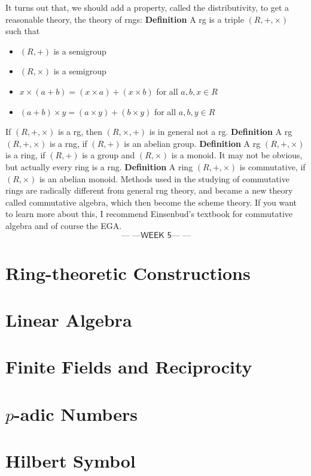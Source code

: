 \documentclass{report}
\newcommand{\week}[1]{$$\textsf{--- ---WEEK #1--- ---}$$}
\begin{document}
It turns out that, we should add a property, called the distributivity, to get a reasonable theory, the theory of rngs:
\newline
\newline
\textbf{Definition} A rg is a triple $(R,+,\times)$ such that
\begin{itemize}
\item $(R,+)$ is a semigroup
\item $(R,\times)$ is a semigroup
\item $x\times(a+b)=(x\times a)+(x\times b)$ for all $a,b,x \in R$
\item $(a+b)\times y = (a\times y)+(b\times y)$ for all $a,b,y \in R$
\end{itemize}
If $(R,+,\times)$ is a rg, then $(R,\times,+)$ is in general not a rg.
\newline
\newline
\textbf{Definition} A rg $(R,+,\times)$ is a rng, if $(R,+)$ is an abelian group.
\newline
\newline
\textbf{Definition} A rg $(R,+,\times)$ is a ring, if $(R,+)$ is a group and $(R,\times)$ is a monoid.
\newline
\newline
It may not be obvious, but actually every ring is a rng.
\newline
\newline
\textbf{Definition} A ring $(R,+,\times)$ is commutative, if $(R,\times)$ is an abelian monoid.
\newline
\newline
Methods used in the studying of commutative rings are radically different from general rng theory, and became a new theory called commutative algebra, which then become the scheme theory. If you want to learn more about this, I recommend Einsenbud's textbook for commutative algebra and of course the EGA.
\newline
\newline
\week{5}
\chapter{Ring-theoretic Constructions}
\chapter{Linear Algebra}
\chapter{Finite Fields and Reciprocity}
\chapter{$p$-adic Numbers}
\chapter{Hilbert Symbol}
\end{document}
